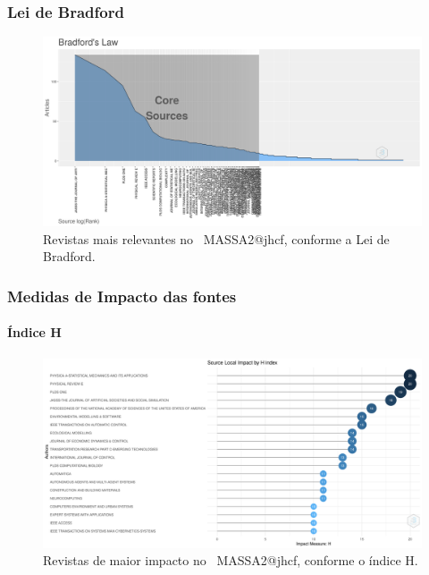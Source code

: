 \subsubsection{Lei de Bradford}

\begin{figure}
    \centering
    \includegraphics[width=1\textwidth]{experiments/jhcf/PesqBibliogr/SimulacaoMultiagente/WoS-20220203/Metricas/Sources/MASSA2-Bradfords-Law.png}
    \caption{Revistas mais relevantes no  \dataset\ MASSA2@jhcf, conforme a Lei de Bradford.}
    \label{fig:MASSA2-Bradfords-Law.png}
\end{figure}

\subsubsection{Medidas de Impacto das fontes}

\paragraph{Índice H}

\begin{figure}
    \centering
    \includegraphics[width=1\textwidth]{experiments/jhcf/PesqBibliogr/SimulacaoMultiagente/WoS-20220203/Metricas/Sources/MASSA2-H-Index-Source-Local-Impact.png}
    \caption{Revistas de maior impacto no  \dataset\ MASSA2@jhcf,  conforme o índice H.}
    \label{fig:MASSA2-H-Index-Source-Local-Impact.png}
\end{figure}


